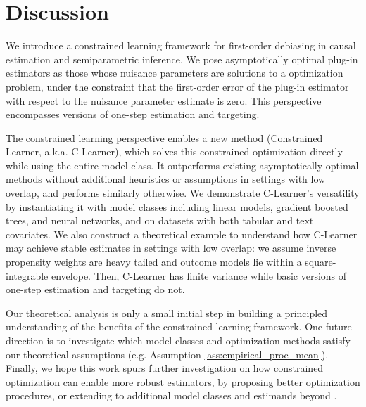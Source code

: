 \section{Discussion}
\label{sec:discussion}
 We introduce a constrained learning framework for first-order debiasing in causal estimation and semiparametric inference.
We pose asymptotically optimal plug-in estimators as those whose nuisance parameters are solutions to a optimization problem, under
the constraint that the first-order error of the plug-in estimator with respect to the nuisance parameter estimate is zero. 
This perspective encompasses versions of one-step estimation and targeting. %

 The constrained learning perspective enables %
a new method %
(Constrained Learner, a.k.a. C-Learner), which solves this constrained optimization directly while using the entire model class. 
It outperforms existing asymptotically optimal methods without additional heuristics or assumptions in settings with low overlap, and performs similarly otherwise. 
We demonstrate C-Learner's versatility by instantiating it with model classes including linear models, gradient boosted trees, and neural networks, and on datasets with both tabular and text covariates. 
We also construct a theoretical example to understand how C-Learner may achieve stable estimates in settings with low overlap: we assume inverse propensity weights are heavy tailed and outcome models lie within a square-integrable envelope. Then, C-Learner has finite variance while basic versions of one-step estimation and targeting do not. 

 Our theoretical analysis is only a small initial step in building a principled understanding of the benefits of the constrained learning framework. One future direction is to investigate which model classes and optimization methods satisfy our theoretical assumptions (e.g. Assumption \ref{ass:empirical_proc_mean}).
Finally, 
we hope this work spurs further investigation on how constrained optimization can enable more robust estimators, by proposing better optimization procedures, or extending to additional model classes and estimands beyond . 


